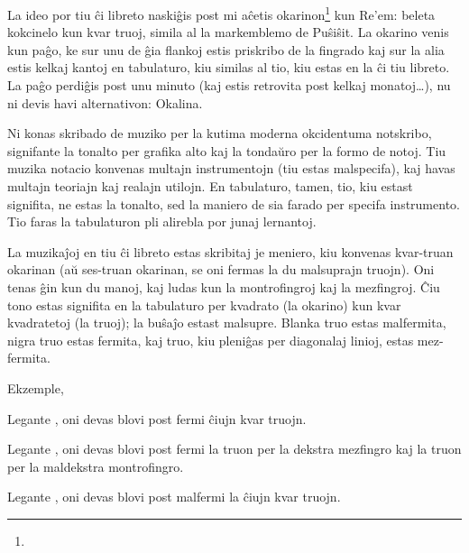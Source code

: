 
La ideo por tiu ĉi libreto naskiĝis post mi aĉetis okarinon\footnote{} kun Re’em: beleta kokcinelo kun kvar truoj, simila al la markemblemo de Puŝiŝit. La okarino venis kun paĝo, ke sur unu de ĝia flankoj estis priskribo de la fingrado kaj sur la alia estis kelkaj kantoj en tabulaturo, kiu similas al tio, kiu estas en la ĉi tiu libreto. La paĝo perdiĝis post unu minuto (kaj estis retrovita post kelkaj monatoj…), nu ni devis havi alternativon: Okalina.



Ni konas skribado de muziko per la kutima moderna okcidentuma notskribo, signifante la tonalto per grafika alto kaj la tondaŭro per la formo de notoj. Tiu muzika notacio konvenas multajn instrumentojn (tiu estas malspecifa), kaj havas multajn teoriajn kaj realajn utilojn. En tabulaturo, tamen, tio, kiu estast signifita, ne estas la tonalto, sed la maniero de sia farado per specifa instrumento. Tio faras la tabulaturon pli alirebla por junaj lernantoj.

La muzikaĵoj en tiu ĉi libreto estas skribitaj je meniero, kiu konvenas kvar-truan okarinan (aŭ ses-truan okarinan, se oni fermas la du malsuprajn truojn). Oni tenas ĝin kun du manoj, kaj ludas kun la montrofingroj kaj la mezfingroj. Ĉiu tono estas signifita en la tabulaturo per kvadrato (la okarino) kun kvar kvadratetoj (la truoj); la buŝaĵo estast malsupre. Blanka truo estas malfermita, nigra truo estas fermita, kaj truo, kiu pleniĝas per diagonalaj linioj, estas mez-fermita.

Ekzemple,
\begin{compactitem}
	\item Legante \enliniatabulaturo{\c}, oni devas blovi post fermi ĉiujn kvar truojn.
	\item Legante \enliniatabulaturo{\gis}, oni devas blovi post fermi la truon per la dekstra mezfingro kaj la truon per la maldekstra montrofingro.
	\item Legante \enliniatabulaturo{\C}, oni devas blovi post malfermi la ĉiujn kvar truojn.
\end{compactitem}


